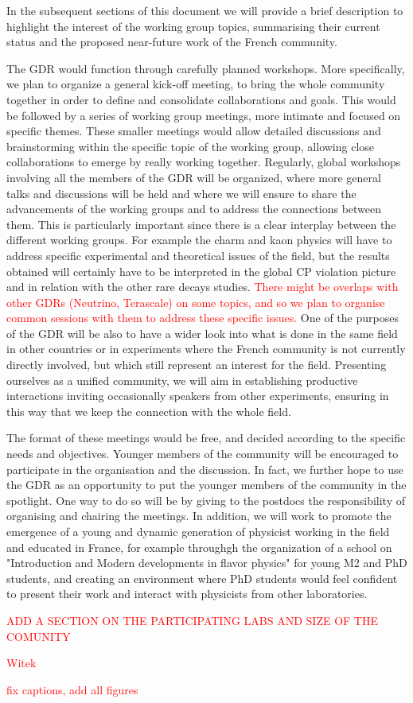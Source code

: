 In the subsequent sections of this document we will provide a brief description to highlight  the interest of the working group topics,  summarising their  current status and the proposed near-future work of the French community. 

The GDR would function through carefully planned workshops. More specifically, we plan to organize a general kick-off meeting, to bring the whole community together in order to define and consolidate collaborations and goals.  
This would be followed by a series of working group meetings, more intimate and focused on specific themes. These smaller meetings would allow detailed discussions and brainstorming within the specific topic of the working group, allowing close collaborations to emerge by really working together. Regularly, global workshops involving all the members of the GDR will be organized, where more general talks and discussions will be held and where we will ensure to share the advancements of the working groups and to address the connections between them. This is particularly important since there is a clear interplay  between the different working groups. For example the charm and kaon physics will have to address specific experimental and theoretical issues of the field, but the results obtained will certainly have to be interpreted in the global CP violation picture and in relation with the other rare decays studies.  \textcolor{red}{There might be overlaps with other GDRs (Neutrino, Terascale) on some topics, and so we plan to organise common sessions with them to address these specific issues.}  
One of the purposes of the GDR will be also to have a wider look into what is done in the same field in other countries or in experiments where the French community is not currently directly involved, but which still represent an interest for the field. Presenting ourselves as a unified community, we will aim in establishing productive interactions inviting occasionally speakers from other experiments, ensuring in this way that we keep the connection with the whole field. 

The format of these meetings would be free, and decided according to the specific needs and objectives.  Younger members of the community will be encouraged to participate in the organisation and the discussion. 
In fact, we further hope to use the GDR as an opportunity to put the younger members of the community in the spotlight. One way to do so will be  by giving to the postdocs the responsibility of organising and chairing the meetings. In addition, we will work to promote the emergence of a young and dynamic generation of physicist working in the field and educated in France, for example throughgh the organization of a school on "Introduction and Modern
developments in flavor physics" for young M2 and PhD students, and creating an environment where PhD students would feel confident to present their work and interact with physicists from other laboratories. 

\textcolor{red}{ADD A SECTION ON THE PARTICIPATING LABS AND SIZE OF THE COMUNITY}

\textcolor{red}{Witek}

\textcolor{red}{fix captions, add all figures}

